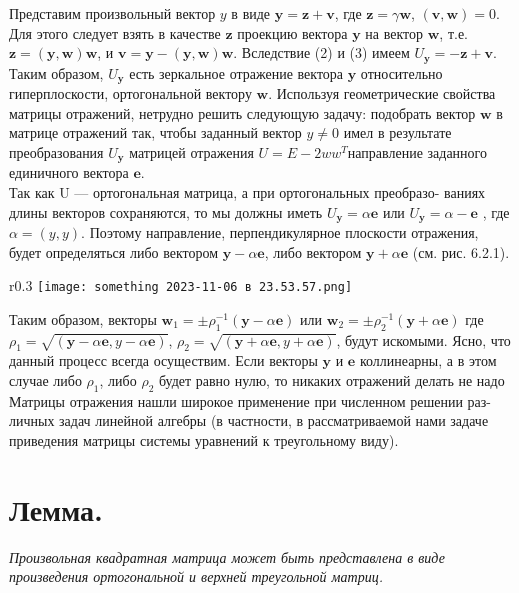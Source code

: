 \documentclass[a4paper, twoside, 12pt]{article}
\begin{document}
Представим произвольный вектор $y$ в виде $\textbf{y} = \textbf{z} + \textbf{v}$, где $\textbf{z} = \gamma \textbf{w}$, $(\textbf{v}, \textbf{w}) = 0$. Для этого следует взять в качестве $\textbf{z}$ проекцию вектора $\textbf{y}$ на вектор $\textbf{w}$, т.е. $\textbf{z} = (\textbf{y},\textbf{w})\textbf{w}$, и $\textbf{v} = \textbf{y}−(\textbf{y},\textbf{w})\textbf{w}$. Вследствие (2) и (3) имеем $U_{\textbf{y}} = −\textbf{z} + \textbf{v}$. Таким образом, $U_{\textbf{y}}$ есть зеркальное отражение вектора $\textbf{y}$ относительно гиперплоскости, ортогональной вектору $\textbf{w}$.
Используя геометрические свойства матрицы отражений, нетрудно решить следующую задачу: подобрать вектор $\textbf{w}$ в матрице отражений так, чтобы заданный вектор $y \neq 0$ имел в результате преобразования $U_{\textbf{y}}$ матрицей отражения $U = E − 2ww^T $направление заданного единичного вектора $\textbf{e}$.
\\
\indent
Так как U — ортогональная матрица, а при ортогональных преобразо- ваниях длины векторов сохраняются, то мы должны иметь $U_{\textbf{y}} = \alpha \textbf{e}$ или
$U_{\textbf{y}} = \alpha -\textbf{e}$ , где $\alpha = (y, y)$. Поэтому направление, перпендикулярное плоскости отражения, будет определяться либо вектором $\textbf{y} − \alpha \textbf{e}$, либо вектором $\textbf{y}+\alpha \textbf{e}$ (см. рис. 6.2.1).
\begin{wrapfigure}{r}{0.3\textwidth}
    \texttt{[image: something 2023-11-06 в 23.53.57.png]}
\end{wrapfigure}
\indent Таким образом, векторы $\textbf{w}_{1} = \pm \rho_{1}^{-1}(\textbf{y} - 
\alpha \textbf{e})$ или $\textbf{w}_{2} = \pm \rho_{2}^{-1}(\textbf{y} + 
\alpha \textbf{e})$  где $\rho_{1} = \sqrt{
(\textbf{y} - \alpha \textbf{e}, y - \alpha \textbf{e})}$, $\rho_{2} = \sqrt{
(\textbf{y} + \alpha \textbf{e}, y + \alpha \textbf{e})}$, будут искомыми. Ясно, что данный процесс всегда осуществим. Если векторы $\textbf{y}$ и $\textbf{e}$ коллинеарны, а в этом случае либо $\rho_{1}$, либо $\rho_{2}$ будет равно нулю, то никаких отражений делать не надо
\\
\indent
Матрицы отражения нашли широкое
применение при численном решении раз-
личных задач линейной алгебры (в частности, в рассматриваемой нами задаче приведения матрицы системы уравнений к треугольному виду). 
\\

\chapter{\textbf{Лемма.}}
\textit{ Произвольная квадратная матрица может быть представлена в виде произведения ортогональной и верхней треугольной матриц.}
\end{document}

